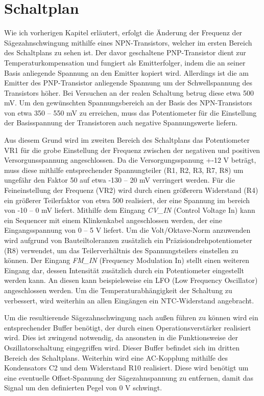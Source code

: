 \section{Schaltplan}
Wie ich vorherigen Kapitel erläutert, erfolgt die Änderung der Frequenz der Sägezahnschwingung mithilfe eines NPN-Transistors, welcher im ersten Bereich des Schaltplans zu sehen ist. 
Der davor geschaltene PNP-Transistor dient zur Temperaturkompensation und fungiert als Emitterfolger, indem die an seiner Basis anliegende Spannung an den Emitter kopiert wird.
Allerdings ist die am Emitter des PNP-Transistor anliegende Spannung um der Schwellspannung des Transistors höher.
Bei Versuchen an der realen Schaltung betrug diese etwa 500 mV.
Um den gewünschten Spannungsbereich an der Basis des NPN-Transistors von etwa 350 -- 550 mV zu erreichen, muss das Potentiometer für die Einstellung der Basisspannung der Transistoren auch negative Spannungswerte liefern.

Aus diesem Grund wird im zweiten Bereich des Schaltplans das Potentiometer VR1 für die grobe Einstellung der Frequenz zwischen der negativen und positiven Versorgunsspannung angeschlossen.
Da die Versorgungsspanung +-12 V beträgt, muss diese mithilfe entsprechender Spannungteiler (R1, R2, R3, R7, R8)  um ungefähr den Faktor 50 auf etwa -130 -- 20 mV verringert werden.
Für die Feineinstellung der Frequenz (VR2) wird durch einen größerern Widerstand (R4) ein größerer Teilerfaktor von etwa 500 realisiert, der eine Spannung im bereich von -10 -- 0 mV liefert.
Mithilfe dem Eingang \textit{CV\_IN} (Control Voltage In) kann ein Sequencer mit einem Klinkenkabel angeschlossen werden, der eine Eingangsspannung von 0 -- 5 V liefert.
Um die Volt/Oktave-Norm anzuwenden wird aufgrund von Bauteiltoleranzen zusätzlich ein Präzisiondrehpotentiometer (R8) verwendet, um das Teilerverhältnis des Spannungsteilers einstellen zu können.
Der Eingang \textit{FM\_IN} (Frequency Modulation In) stellt einen weiteren Eingang dar, dessen Intensität zusätzlich durch ein Potentiometer eingestellt werden kann. 
An diesen kann beispielsweise ein LFO (Low Frequency Oscillator) angeschlossen werden.
Um die Temperaturabhängigkeit der Schaltung zu verbessert, wird weiterhin an allen Eingängen ein NTC-Widerstand angebracht.

Um die resultierende Sägezahnschwingung nach außen führen zu können wird ein entsprechender Buffer benötigt, der durch einen Operationsverstärker realisiert wird.
Dies ist zwingend notwendig, da ansonsten in die Funktionsweise der Oszillatorschaltung eingegriffen wird. 
Dieser Buffer befindet sich im dritten Bereich des Schaltplans.
Weiterhin wird eine AC-Kopplung mithilfe des Kondensators C2 und dem Widerstand R10 realisiert. Diese wird benötigt um eine eventuelle Offset-Spannung der Sägezahnspannung zu entfernen, damit das Signal um den definierten Pegel von 0 V schwingt.

